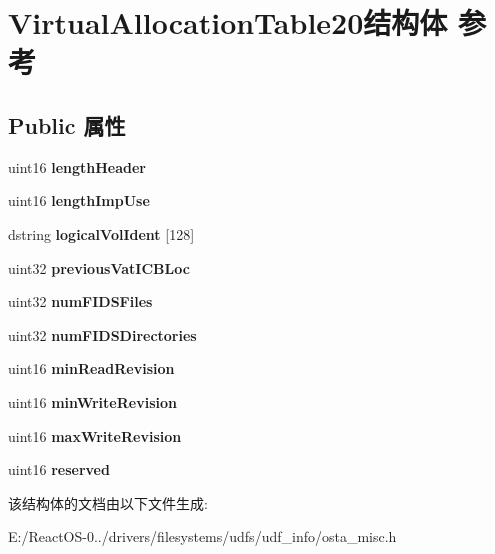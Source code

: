 \hypertarget{struct_virtual_allocation_table20}{}\section{Virtual\+Allocation\+Table20结构体 参考}
\label{struct_virtual_allocation_table20}
\subsection*{Public 属性}
\begin{DoxyCompactItemize}
\item 
\mbox{\label{struct_virtual_allocation_table20_a72da902501486ed8bda1eff30f2e9f0d}} 
uint16 {\bfseries length\+Header}
\item 
\mbox{\label{struct_virtual_allocation_table20_ae34cc22c2b1ad01582b30e125ea547d3}} 
uint16 {\bfseries length\+Imp\+Use}
\item 
\mbox{\label{struct_virtual_allocation_table20_ad501a045a386e9421923c62a96593ed7}} 
dstring {\bfseries logical\+Vol\+Ident} \mbox{[}128\mbox{]}
\item 
\mbox{\label{struct_virtual_allocation_table20_a58501a75a7071203fc7b35a31b4f772c}} 
uint32 {\bfseries previous\+Vat\+I\+C\+B\+Loc}
\item 
\mbox{\label{struct_virtual_allocation_table20_adf9390aa636b50486e04c5fbe100008a}} 
uint32 {\bfseries num\+F\+I\+D\+S\+Files}
\item 
\mbox{\label{struct_virtual_allocation_table20_af98948e2bb48c0e41344a13d8bbc84ce}} 
uint32 {\bfseries num\+F\+I\+D\+S\+Directories}
\item 
\mbox{\label{struct_virtual_allocation_table20_af266f030b49a2c031503e59690f55586}} 
uint16 {\bfseries min\+Read\+Revision}
\item 
\mbox{\label{struct_virtual_allocation_table20_a72399cd48f6c0aa4ab3270817f747bd7}} 
uint16 {\bfseries min\+Write\+Revision}
\item 
\mbox{\label{struct_virtual_allocation_table20_a97886ba33d0acd668b8b5d06fb633b63}} 
uint16 {\bfseries max\+Write\+Revision}
\item 
\mbox{\label{struct_virtual_allocation_table20_a91004f453bb1b4265cdeaa748836879f}} 
uint16 {\bfseries reserved}
\end{DoxyCompactItemize}


该结构体的文档由以下文件生成\+:\begin{DoxyCompactItemize}
\item 
E\+:/\+React\+O\+S-\/0../drivers/filesystems/udfs/udf\+\_\+info/osta\+\_\+misc.\+h\end{DoxyCompactItemize}
